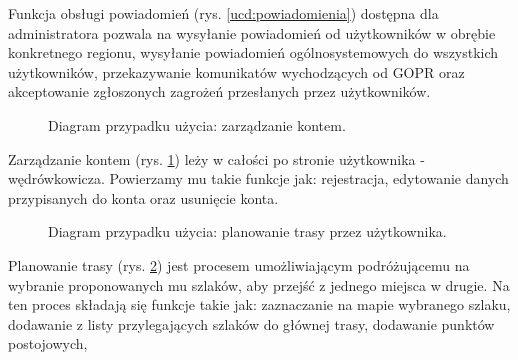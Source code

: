     Funkcja obsługi powiadomień (rys. \ref{ucd:powiadomienia}) dostępna dla administratora pozwala na wysyłanie powiadomień od użytkowników w obrębie konkretnego regionu, wysyłanie powiadomień ogólnosystemowych do wszystkich użytkowników, przekazywanie komunikatów wychodzących od GOPR oraz akceptowanie zgłoszonych zagrożeń przesłanych przez użytkowników.

    \setlength{\fboxrule}{0.5pt}
    \begin{figure}[H]
        \centering
        \caption{Diagram przypadku użycia: zarządzanie kontem.}
        \label{ucd:konto}
    \end{figure}
    Zarządzanie kontem (rys. \ref{ucd:konto}) leży w całości po stronie użytkownika - wędrówkowicza. Powierzamy mu takie funkcje jak: rejestracja, edytowanie danych przypisanych do konta oraz usunięcie konta.

    \setlength{\fboxrule}{0.5pt}
    \begin{figure}[H]
        \centering
        \caption{Diagram przypadku użycia: planowanie trasy przez użytkownika.}
        \label{ucd:planowanie}
    \end{figure}
    Planowanie trasy (rys. \ref{ucd:planowanie}) jest procesem umożliwiającym podróżującemu na wybranie proponowanych mu szlaków, aby przejść z jednego miejsca w drugie. Na ten proces składają się funkcje takie jak: zaznaczanie na mapie wybranego szlaku, dodawanie z listy przylegających szlaków do głównej trasy, dodawanie punktów postojowych,

